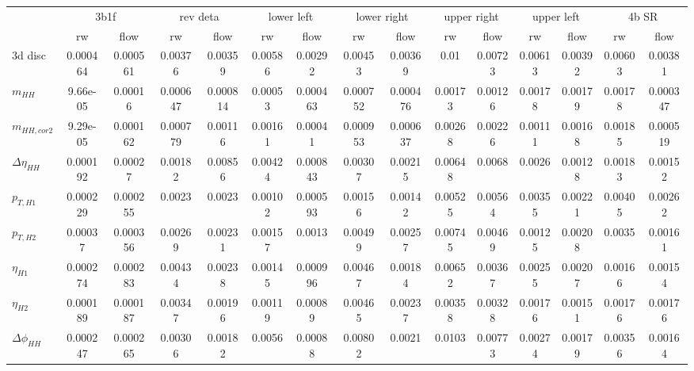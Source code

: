 \begin{table}
\centering\begin{adjustbox}{width=\columnwidth,center}
\label{tab:kl_Xwt_cut}
\begin{tabular}{lcccccccccccccc}
\toprule
{} & \multicolumn{2}{c}{3b1f} & \multicolumn{2}{c}{rev deta} & \multicolumn{2}{c}{lower left} & \multicolumn{2}{c}{lower right} & \multicolumn{2}{c}{upper right} & \multicolumn{2}{c}{upper left} & \multicolumn{2}{c}{4b SR} \\
{} &       rw &     flow &       rw &     flow &         rw &     flow &          rw &     flow &          rw &    flow &         rw &    flow &      rw &     flow \\
\midrule
3d disc            & 0.000464 & 0.000561 &  0.00376 &  0.00359 &    0.00586 &  0.00292 &     0.00453 &  0.00369 &        0.01 & 0.00723 &    0.00613 & 0.00392 & 0.00603 &  0.00381 \\
$m_{HH}$           & 9.66e-05 &  0.00016 & 0.000647 & 0.000814 &    0.00053 & 0.000463 &    0.000752 & 0.000476 &     0.00173 & 0.00126 &    0.00178 & 0.00179 & 0.00178 & 0.000347 \\
$m_{HH,cor2}$      & 9.29e-05 & 0.000162 & 0.000779 &  0.00116 &    0.00161 &  0.00041 &    0.000953 & 0.000637 &     0.00268 & 0.00226 &    0.00111 & 0.00168 & 0.00185 & 0.000519 \\
$\Delta \eta_{HH}$ & 0.000192 &  0.00027 &  0.00182 &  0.00856 &    0.00424 & 0.000843 &     0.00307 &  0.00215 &     0.00648 &  0.0068 &     0.0026 & 0.00128 & 0.00183 &  0.00152 \\
$p_{T,H1}$         & 0.000229 & 0.000255 &   0.0023 &   0.0023 &    0.00102 & 0.000593 &     0.00156 &  0.00142 &     0.00525 & 0.00564 &    0.00355 & 0.00221 & 0.00405 &  0.00262 \\
$p_{T,H2}$         &  0.00037 & 0.000356 &  0.00269 &  0.00231 &    0.00157 &   0.0013 &     0.00499 &  0.00257 &     0.00745 & 0.00469 &    0.00125 & 0.00208 &  0.0035 &  0.00161 \\
$\eta_{H1}$        & 0.000274 & 0.000283 &  0.00434 &  0.00238 &    0.00145 & 0.000996 &     0.00467 &  0.00184 &     0.00652 & 0.00367 &    0.00255 & 0.00207 & 0.00166 &  0.00154 \\
$\eta_{H2}$        & 0.000189 & 0.000187 &  0.00347 &  0.00196 &    0.00119 &  0.00089 &     0.00465 &  0.00237 &     0.00358 & 0.00328 &    0.00176 & 0.00151 & 0.00176 &  0.00176 \\
$\Delta \phi_{HH}$ & 0.000247 & 0.000265 &  0.00306 &  0.00182 &     0.0056 &  0.00088 &     0.00802 &   0.0021 &      0.0103 & 0.00773 &    0.00274 & 0.00179 & 0.00356 &  0.00164 \\

\end{tabular}
\end{adjustbox}
\end{table}
